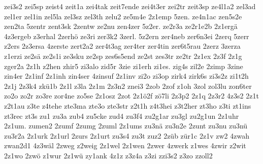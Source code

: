 {zei3s2
zei5sp
zeist4
zeit1a
zei4tak
zeit7ende
zei4t3er
zei2tr
zeit3sp
ze4l1a2
zel3ad
zel1er
zel1in
zel5la
zel3sz
zel3th
zelu2
ze5m4e
2z1emp
5zen.
ze4n1ac
zen5s2e
zen2ta
5zentr
zent3sk
2zentw
ze2nu
zen4zer
5z2er.
ze2r3a
ze2r1e2b
2z1ergä
4z3ergeb
z3erhal
2zerhö
ze3ri
zer3k2
3zerl.
5z2ern
zer4neb
zer6n3ei
2zerq
5zerr
z2ers
2z3ersa
4zerste
zert2a2
zer4t3ag
zer4ter
zer4tin
zer6t5rau
2zerz
3zerza
z1erzi
ze2sä
ze2s1i
ze3sku
ze2sp
zes6s5end
ze2st
zes3tr
ze2tr
2z1ex
2z3f
2z1g
zger2a
2z1h
z2hen
zhir5
zi3alo
zid5r
3zie
zi1erh
zi1es.
zig4s
zil2e
2zimp
3zine
zin4er
2z1inf
2z1inh
zin4ser
4zinsuf
2z1inv
zi2o
zi3op
zirk4
zirk6s
zi3s2z
zi1t2h
2z1j
2z3k4
zkü1b
2z1l
z3la
2z1m
2z3n2
znei3
2zob
2zof
z1oh
3zol
zol3lu
zon6ter
zo2o
zo2r
zo3re
zor4ne
zo5se
2z1osz
2zot
2z1ö2f
zö7li
2z3p2
2z1q
2z3r2
4z3s2
2z1t
z2t1au
z3te
z4tehe
zte3ma
zte3o
zte3str
z2t1h
z4t3hei
z3t2her
zt3ho
z3ti
zt1ins
zt3rec
zt3s
zu1
zu3a
zub4
zu5cke
zud4
zu3f4
zu2g1ar
zu3gl
zu2g1un
2z1uhr
2z1um.
zumen2
2zumf
2zumg
2zuml
2z1ums
zu3nä
zu3n2e
2zunt
zu3nu
zu3nü
zu3r2a
2z1urk
2z1url
2zurs
2z1urt
zu3s4
zu3t
zuz2
2züb
zür1c
2z1v
zw2
4zwah
zwan2d1
4z3wäl
2zweg
z2weig
2z1wel
2z1wen
2zwer
4zwerk
z1wes
4zwir
z2wit
2z1wo
2zwö
z1wur
2z1wü
zy1ank
4z1z
z3z4a
z3zi
zzi3s2
z3zo
zzoll2
}

